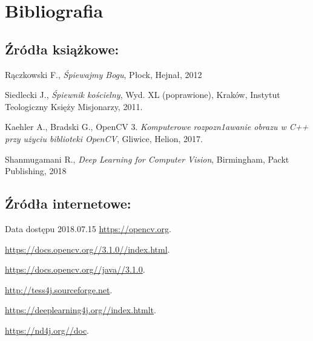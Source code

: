 \documentclass[a4paper,12pt]{article}
\begin{document}
	   
	   
	   \newpage

        \section{Bibliografia}
        \begin{thebibliography}{99}
            \subsection{Źródła książkowe:}
            Rączkowski F., \textit{Śpiewajmy Bogu}, Płock, Hejnał, 2012
 
            Siedlecki J., \textit{Śpiewnik kościelny}, Wyd. XL (poprawione), Kraków,
            Instytut Teologiczny Księży Misjonarzy, 2011.
        
            Kaehler A., Bradski G., OpenCV 3. \textit{Komputerowe rozpozn1awanie obrazu w C++ przy użyciu biblioteki OpenCV}, Gliwice, Helion, 2017.
            
            Shanmugamani R., \textit{Deep Learning for Computer Vision}, Birmingham, Packt Publishing, 2018

            \subsection{Źródła internetowe:}
            Data dostępu 2018.07.15
            \href{https://opencv.org}{\url{https://opencv.org}}.
            
            \href{https://docs.opencv.org//3.1.0//index.html}{\url{https://docs.opencv.org//3.1.0//index.html}}.
            
            \href{https://docs.opencv.org//java//3.1.0}{\url{https://docs.opencv.org//java//3.1.0}}.
            
            \href{http://tess4j.sourceforge.net}{\url{http://tess4j.sourceforge.net}}.
            
            \href{https://deeplearning4j.org//index.html}{\url{https://deeplearning4j.org//index.htmlt}}.
            
            \href{https://nd4j.org//doc}{\url{https://nd4j.org//doc}}.
            

\end{thebibliography}
\end{document}
